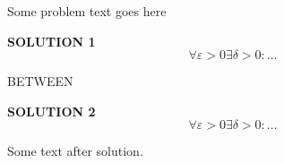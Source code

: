 \documentclass{article}
\begin{document}
  Some problem text goes here

  \begin{solution}
    \textbf{SOLUTION 1}
    \[ \forall\varepsilon>0\exists\delta>0:\dots \]
\end{solution}

  BETWEEN

\begin{solution}
    \textbf{SOLUTION 2}
    \[ \forall\varepsilon>0\exists\delta>0:\dots \]
\end{solution}
  Some text after solution.
\end{document}
